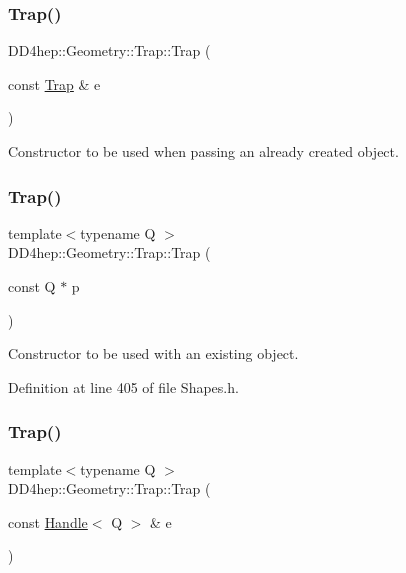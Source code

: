 \subsubsection{\texorpdfstring{Trap()}{Trap()}\hspace{0.1cm}{\footnotesize\ttfamily [2/7]}}
{\footnotesize\ttfamily D\+D4hep\+::\+Geometry\+::\+Trap\+::\+Trap (\begin{DoxyParamCaption}\item[{const \hyperlink{class_d_d4hep_1_1_geometry_1_1_trap}{Trap} \&}]{e }\end{DoxyParamCaption})\hspace{0.3cm}{\ttfamily [default]}}



Constructor to be used when passing an already created object. 

\hypertarget{class_d_d4hep_1_1_geometry_1_1_trap_a96b503e8c6348aee9c4d68044e147ad3}{}\label{class_d_d4hep_1_1_geometry_1_1_trap_a96b503e8c6348aee9c4d68044e147ad3} 
\subsubsection{\texorpdfstring{Trap()}{Trap()}\hspace{0.1cm}{\footnotesize\ttfamily [3/7]}}
{\footnotesize\ttfamily template$<$typename Q $>$ \\
D\+D4hep\+::\+Geometry\+::\+Trap\+::\+Trap (\begin{DoxyParamCaption}\item[{const Q $\ast$}]{p }\end{DoxyParamCaption})\hspace{0.3cm}{\ttfamily [inline]}}



Constructor to be used with an existing object. 



Definition at line 405 of file Shapes.\+h.

\hypertarget{class_d_d4hep_1_1_geometry_1_1_trap_ac4047fefb1a80fb3172eb2572177dd19}{}\label{class_d_d4hep_1_1_geometry_1_1_trap_ac4047fefb1a80fb3172eb2572177dd19} 
\subsubsection{\texorpdfstring{Trap()}{Trap()}\hspace{0.1cm}{\footnotesize\ttfamily [4/7]}}
{\footnotesize\ttfamily template$<$typename Q $>$ \\
D\+D4hep\+::\+Geometry\+::\+Trap\+::\+Trap (\begin{DoxyParamCaption}\item[{const \hyperlink{class_d_d4hep_1_1_handle}{Handle}$<$ Q $>$ \&}]{e }\end{DoxyParamCaption})\hspace{0.3cm}{\ttfamily [inline]}}



